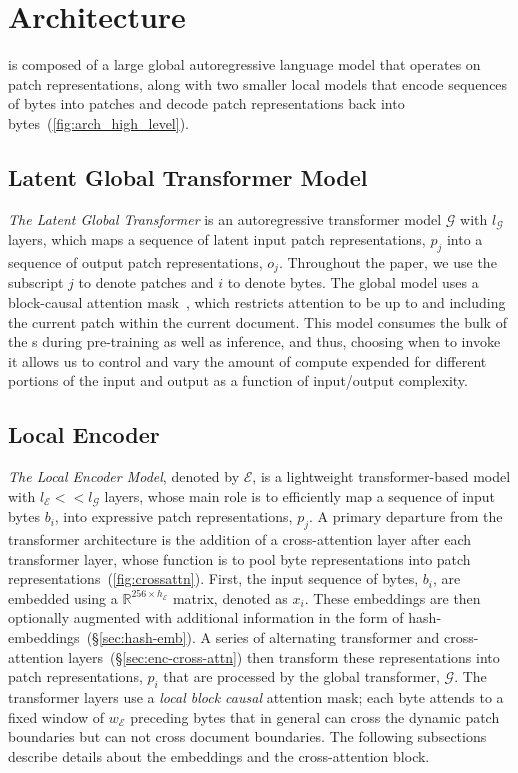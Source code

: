\documentclass[]{fairmeta}
\begin{document}
\section{\model{} Architecture}
\label{section:architecture}
\model{} is composed of a large global autoregressive language model that operates on patch representations, along with two smaller local models that encode sequences of bytes into patches and decode patch representations back into bytes~(\autoref{fig:arch_high_level}). 

\subsection{Latent Global Transformer Model}

\textit{The Latent Global Transformer} is an autoregressive transformer model $\mathcal{G}$ with $l_{\mathcal{G}}$ layers, which maps a sequence of latent input patch representations, $p_j$ into a sequence of output patch representations, $o_j$. Throughout the paper, we use the subscript $j$ to denote patches and $i$ to denote bytes. The global model uses a block-causal attention mask~\citep{dubey2024llama}, which restricts attention to be up to and including the current patch  within the current document. This model consumes the bulk of the \flop{}s during pre-training as well as inference, and thus, choosing when to invoke it allows us to control and vary the amount of compute expended for different portions of the input and output as a function of input/output complexity.

\subsection{Local Encoder}
\label{section:local}

\textit{The Local Encoder Model}, denoted by $\mathcal{E}$, is a lightweight transformer-based model with $l_{\mathcal{E}} << l_{\mathcal{G}}$ layers, whose main role is to efficiently map a sequence of input bytes $b_i$, into expressive patch representations, $p_j$.
A primary departure from the transformer architecture is the addition of a cross-attention layer after each transformer layer, whose function is to pool byte representations into patch representations~(\autoref{fig:crossattn}).
First, the input sequence of bytes, $b_i$, are embedded using a $\mathbb{R}^{256 \times h_{\mathcal{E}}}$ matrix, denoted as $x_i$.
These embeddings are then optionally augmented with additional information in the form of hash-embeddings~(\S\ref{sec:hash-emb}).
A series of alternating transformer and cross-attention layers~(\S\ref{sec:enc-cross-attn}) then transform these representations into patch representations, $p_i$ that are processed by the global transformer, $\mathcal{G}$.
The transformer layers use a \textit{local block causal} attention mask; each byte attends to a fixed window of $w_{\mathcal{E}}$ preceding bytes that in general can cross the dynamic patch boundaries but can not cross document boundaries.
The following subsections describe details about the embeddings and the cross-attention block.
\end{document}
